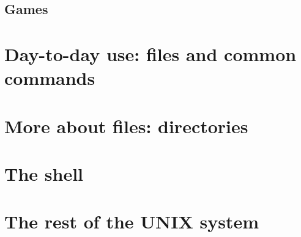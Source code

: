 \subsection{Games}

\section{Day-to-day use: files and common commands}
\section{More about files: directories}
\section{The shell}
\section{The rest of the UNIX system}
